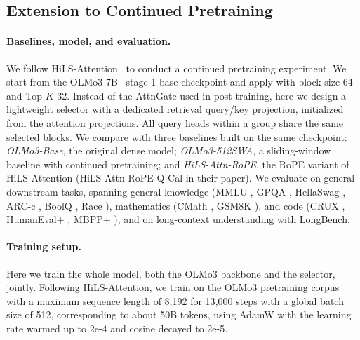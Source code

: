\subsection{Extension to Continued Pretraining}
\label{sec:exp_cpt}

\paragraph{Baselines, model, and evaluation.}
We follow HiLS-Attention~\cite{hu2026hierarchical} to conduct a continued pretraining experiment.
We start from the OLMo3-7B~\cite{olmo2026olmo3} stage-1 base checkpoint and apply \our with block size 64 and Top-$K$ 32.
Instead of the AttnGate used in post-training, here we design a lightweight selector with a dedicated retrieval query/key projection, initialized from the attention projections. All query heads within a group share the same selected blocks.
We compare with three baselines built on the same checkpoint: \emph{OLMo3-Base}, the original dense model; \emph{OLMo3-512SWA}, a sliding-window baseline with continued pretraining; and \emph{HiLS-Attn-RoPE}, the RoPE variant of HiLS-Attention (HiLS-Attn RoPE-Q-Cal in their paper).
We evaluate on general downstream tasks, spanning general knowledge (MMLU \cite{hendryckstest2021}, GPQA \cite{rein2024gpqa}, HellaSwag \cite{zellers2019hellaswag}, ARC-c \cite{clark2018think}, BoolQ \cite{clark2019boolq}, Race \cite{lai-etal-2017-race}), mathematics (CMath \cite{wei2023cmathlanguagemodelpass}, GSM8K \cite{cobbe2021gsm8k}), and code (CRUX \cite{gu2024cruxevalbenchmarkcodereasoning}, HumanEval+ \cite{evalplus}, MBPP+ \cite{austin2021programsynthesislargelanguage}), and on long-context understanding with LongBench.


\paragraph{Training setup.}
Here we train the whole model, both the OLMo3 backbone and the selector, jointly.
Following HiLS-Attention, we train on the OLMo3 pretraining corpus with a maximum sequence length of 8{,}192 for 13{,}000 steps with a global batch size of 512, corresponding to about 50B tokens, using AdamW with the learning rate warmed up to 2e-4 and cosine decayed to 2e-5.


